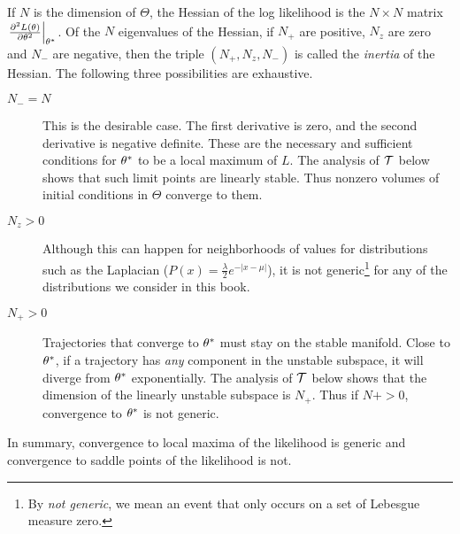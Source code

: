 If $N$ is the dimension of $\Theta$, the Hessian of the log likelihood
is the $N\times N$ matrix $\left. \frac{\partial^2 L(\theta) }{
    \partial \theta^2 }\right| _{\theta^*}$.  Of the $N$
eigenvalues of the Hessian, if $N_+$ are positive, $N_z$ are zero and
$N_-$ are negative, then the triple $(N_+,N_z,N_-)$ is called the
\emph{inertia} of the Hessian.  The following three possibilities are
exhaustive.
\begin{description}
\item[$N_- = N$] This is the desirable case.  The first derivative
  is zero, and the second derivative is negative definite.  These
  are the necessary and sufficient conditions for $\theta^*$ to
  be a local maximum of $L$.  The analysis of $\EMmap$ below shows
  that such limit points are linearly stable.  Thus nonzero volumes
  of initial conditions in $\Theta$ converge to them.
\item[$N_z >0$] Although this can happen for neighborhoods of values
  for distributions such as the Laplacian ($P(x) = \frac{\lambda}{2}
  e^{-\left| x-\mu\right| }$), it is not generic\footnote{By \emph{not
      generic}, we mean an event that only occurs on a set of
    Lebesgue measure zero.} for any of the distributions we consider
  in this book.
\item[$N_+ >0$] Trajectories that converge to $\theta^*$ must
  stay on the stable manifold.  Close to $\theta^*$, if a
  trajectory has \emph{any} component in the unstable subspace, it
  will diverge from $\theta^*$ exponentially.  The analysis of
  $\EMmap$ below shows that the dimension of the linearly unstable
  subspace is $N_+$.  Thus if $N+ >0$, convergence to
  $\theta^*$ is not generic.
\end{description}
In summary, convergence to local maxima of the likelihood is generic
and convergence to saddle points of the likelihood is not.

